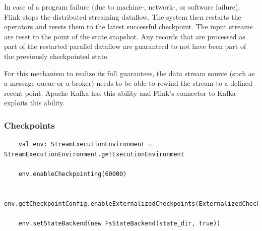 In case of a program failure (due to machine-, network-, or software failure), Flink stops the distributed streaming dataflow. The system then restarts the operators and resets them to the latest successful checkpoint. The input streams are reset to the point of the state snapshot. Any records that are processed as part of the restarted parallel dataflow are guaranteed to not have been part of the previously checkpointed state.

For this mechanism to realize its full guarantees, the data stream source (such as a message queue or a broker) needs to be able to rewind the stream to a defined recent point. Apache Kafka has this ability and Flink’s connector to Kafka exploits this ability.

\subsubsection{Checkpoints}

\begin{code}
    \label{code:checkpointing}
    \begin{verbatim}
    val env: StreamExecutionEnvironment = StreamExecutionEnvironment.getExecutionEnvironment
    
    env.enableCheckpointing(60000)
    
    env.getCheckpointConfig.enableExternalizedCheckpoints(ExternalizedCheckpointCleanup.RETAIN_ON_CANCELLATION)
    
    env.setStateBackend(new FsStateBackend(state_dir, true)) 
    \end{verbatim}
\end{code}~\\

